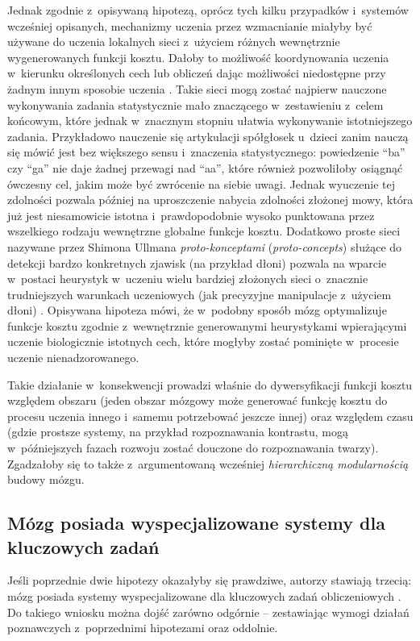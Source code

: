 Jednak zgodnie z~opisywaną hipotezą, oprócz tych kilku przypadków i~systemów wcześniej opisanych,  mechanizmy uczenia przez wzmacnianie miałyby być używane do uczenia lokalnych sieci z~użyciem różnych wewnętrznie wygenerowanych funkcji kosztu.
Dałoby to możliwość koordynowania uczenia w~kierunku określonych cech lub obliczeń dając możliwości niedostępne przy żadnym innym sposobie uczenia \cite{ullman2012simple}.
Takie sieci mogą zostać najpierw nauczone wykonywania zadania statystycznie mało znaczącego w~zestawieniu z~celem końcowym, które jednak w~znacznym stopniu ułatwia wykonywanie istotniejszego zadania.
Przykładowo nauczenie się artykulacji spółgłosek u~dzieci zanim nauczą się mówić jest bez większego sensu i~znaczenia statystycznego: powiedzenie ``ba'' czy ``ga'' nie daje żadnej przewagi nad ``aa'', które również pozwoliłoby osiągnąć ówczesny cel, jakim może być zwrócenie na siebie uwagi.
Jednak wyuczenie tej zdolności pozwala później na uproszczenie nabycia zdolności złożonej mowy, która już jest niesamowicie istotna i~prawdopodobnie wysoko punktowana przez wszelkiego rodzaju wewnętrzne globalne funkcje kosztu.
Dodatkowo proste sieci nazywane przez Shimona Ullmana \emph{proto-konceptami} (\emph{proto-concepts}) służące do detekcji bardzo konkretnych zjawisk (na przykład dłoni) pozwala na wparcie w~postaci heurystyk w~uczeniu wielu bardziej złożonych sieci o~znacznie trudniejszych warunkach uczeniowych (jak precyzyjne manipulacje z~użyciem dłoni) \cite{ullman2012simple}.
Opisywana hipoteza mówi, że w~podobny sposób mózg optymalizuje funkcje kosztu zgodnie z~wewnętrznie generowanymi heurystykami wpierającymi uczenie biologicznie istotnych cech, które mogłyby zostać pominięte w~procesie uczenie nienadzorowanego.

Takie działanie w~konsekwencji prowadzi właśnie do dywersyfikacji funkcji kosztu względem obszaru (jeden obszar mózgowy może generować funkcję kosztu do procesu uczenia innego i~samemu potrzebować jeszcze innej) oraz względem czasu (gdzie prostsze systemy, na przykład rozpoznawania kontrastu, mogą w~późniejszych fazach rozwoju zostać douczone do rozpoznawania twarzy).
Zgadzałoby się to także z~argumentowaną wcześniej \emph{hierarchiczną modularnością} budowy mózgu.

\subsection{Mózg posiada wyspecjalizowane systemy dla kluczowych zadań}

Jeśli poprzednie dwie hipotezy okazałyby się prawdziwe, autorzy stawiają trzecią: mózg posiada systemy wyspecjalizowane dla kluczowych zadań obliczeniowych \cite{marblestone2016toward}.
Do takiego wniosku można dojść zarówno odgórnie -- zestawiając wymogi działań poznawczych z~poprzednimi hipotezami oraz oddolnie.

